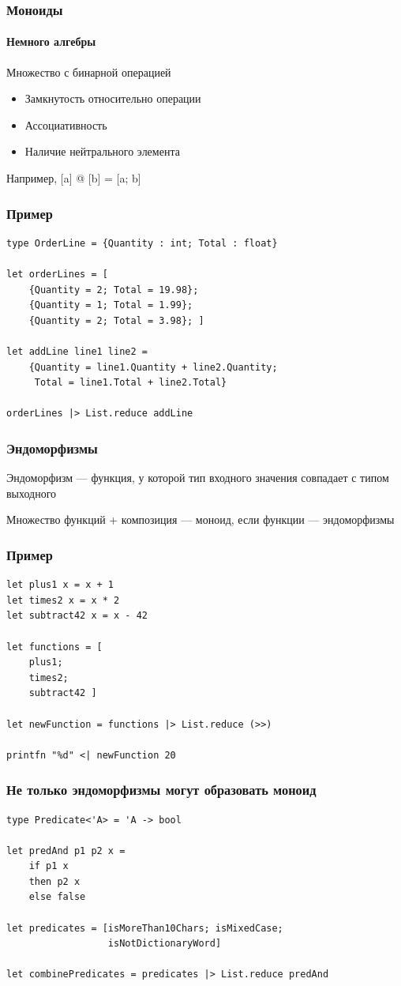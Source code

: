 \documentclass{../../slides-style}
\begin{document}
    \begin{frame}
        \frametitle{Моноиды}
        \framesubtitle{Немного алгебры}
        Множество с бинарной операцией
        \begin{itemize}
            \item Замкнутость относительно операции
            \item Ассоциативность
            \item Наличие нейтрального элемента
        \end{itemize}
        Например, [a] @ [b] = [a; b]
    \end{frame}

    \begin{frame}[fragile]
        \frametitle{Пример}
        \begin{verbatim}
type OrderLine = {Quantity : int; Total : float}

let orderLines = [
    {Quantity = 2; Total = 19.98};
    {Quantity = 1; Total = 1.99};
    {Quantity = 2; Total = 3.98}; ]
    
let addLine line1 line2 =
    {Quantity = line1.Quantity + line2.Quantity; 
     Total = line1.Total + line2.Total}
     
orderLines |> List.reduce addLine
        \end{verbatim}
    \end{frame}

    \begin{frame}
        \frametitle{Эндоморфизмы}
        Эндоморфизм --- функция, у которой тип входного значения совпадает с типом выходного
        
        \vspace{1cm}
        Множество функций + композиция --- моноид, если функции --- эндоморфизмы
    \end{frame}

    \begin{frame}[fragile]
        \frametitle{Пример}
        \begin{verbatim}
let plus1 x = x + 1
let times2 x = x * 2
let subtract42 x = x - 42

let functions = [
    plus1;
    times2;
    subtract42 ]

let newFunction = functions |> List.reduce (>>)

printfn "%d" <| newFunction 20
        \end{verbatim}
    \end{frame}

    \begin{frame}[fragile]
        \frametitle{Не только эндоморфизмы могут образовать моноид}
        \begin{verbatim}
type Predicate<'A> = 'A -> bool

let predAnd p1 p2 x = 
    if p1 x 
    then p2 x
    else false

let predicates = [isMoreThan10Chars; isMixedCase; 
                  isNotDictionaryWord]

let combinePredicates = predicates |> List.reduce predAnd
        \end{verbatim}
    \end{frame}
\end{document}
